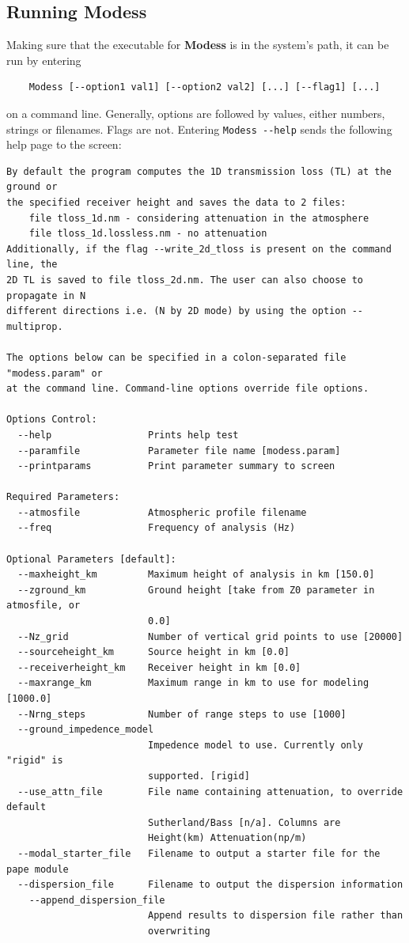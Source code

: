 \subsection{Running Modess}
\label{sec:running modess}

Making sure that the executable for {\bf Modess} is in the system's path, it can be run by entering 
\begin{verbatim} 
    Modess [--option1 val1] [--option2 val2] [...] [--flag1] [...] 
\end{verbatim}
on a command line. Generally, options are followed by values, either numbers, strings or filenames. Flags are not. Entering \verb"Modess --help" sends the following help page to the screen: 

\begin{verbatim}
By default the program computes the 1D transmission loss (TL) at the ground or
the specified receiver height and saves the data to 2 files:
    file tloss_1d.nm - considering attenuation in the atmosphere
    file tloss_1d.lossless.nm - no attenuation
Additionally, if the flag --write_2d_tloss is present on the command line, the
2D TL is saved to file tloss_2d.nm. The user can also choose to propagate in N
different directions i.e. (N by 2D mode) by using the option --multiprop.

The options below can be specified in a colon-separated file "modess.param" or
at the command line. Command-line options override file options.

Options Control:
  --help                 Prints help test
  --paramfile            Parameter file name [modess.param]
  --printparams          Print parameter summary to screen

Required Parameters:
  --atmosfile            Atmospheric profile filename
  --freq                 Frequency of analysis (Hz)

Optional Parameters [default]:
  --maxheight_km         Maximum height of analysis in km [150.0]
  --zground_km           Ground height [take from Z0 parameter in atmosfile, or
                         0.0]
  --Nz_grid              Number of vertical grid points to use [20000]
  --sourceheight_km      Source height in km [0.0]
  --receiverheight_km    Receiver height in km [0.0]
  --maxrange_km          Maximum range in km to use for modeling [1000.0]
  --Nrng_steps           Number of range steps to use [1000]
  --ground_impedence_model
                         Impedence model to use. Currently only "rigid" is
                         supported. [rigid]
  --use_attn_file        File name containing attenuation, to override default
                         Sutherland/Bass [n/a]. Columns are
                         Height(km) Attenuation(np/m)
  --modal_starter_file   Filename to output a starter file for the pape module
  --dispersion_file      Filename to output the dispersion information
    --append_dispersion_file
                         Append results to dispersion file rather than
                         overwriting


\end{verbatim}
